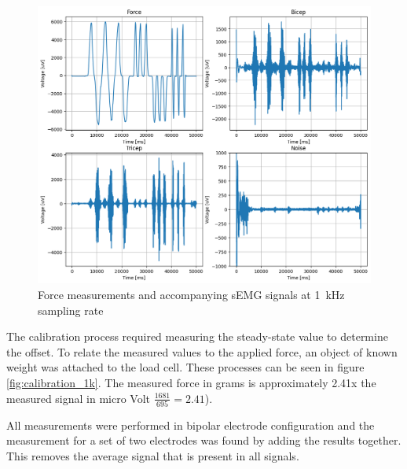 \begin{figure}[h!t]
	\begin{center}
		\includegraphics[width=1.0\columnwidth]{images/measurement_meting3_1k.png}
	\end{center}
	\caption{Force measurements and accompanying sEMG signals at \SI{1}{\kilo\hertz} sampling rate}
	\label{fig:measurement_1k}
\end{figure}

The calibration process required measuring the steady-state value to determine the offset. To relate the measured values to the applied force, an object of known weight was attached to the load cell. These processes can be seen in figure \ref{fig:calibration_1k}. The measured force in grams is approximately 2.41x the measured signal in micro Volt $\frac{1681}{695} = 2.41$).

All measurements were performed in bipolar electrode configuration and the measurement for a set of two electrodes was found by adding the results together. This removes the average signal that is present in all signals.

